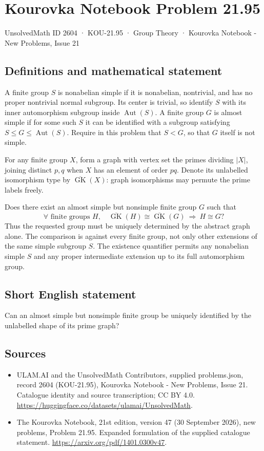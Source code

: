 \documentclass[11pt,a4paper]{article}
\begin{document}
\section*{Kourovka Notebook Problem 21.95}\label{2604}
{\small UnsolvedMath ID 2604 · KOU-21.95 · Group Theory · Kourovka Notebook - New Problems, Issue 21}
\subsection{Definitions and mathematical statement}
A finite group $S$ is nonabelian simple if it is nonabelian, nontrivial, and has no proper nontrivial normal subgroup. Its center is trivial, so identify $S$ with its inner automorphism subgroup inside $\operatorname{Aut}(S)$. A finite group $G$ is almost simple if for some such $S$ it can be identified with a subgroup satisfying $S\le G\le\operatorname{Aut}(S)$. Require in this problem that $S<G$, so that $G$ itself is not simple.

For any finite group $X$, form a graph with vertex set the primes dividing $|X|$, joining distinct $p,q$ when $X$ has an element of order $pq$. Denote its unlabelled isomorphism type by $\overline{\operatorname{GK}}(X)$: graph isomorphisms may permute the prime labels freely.

Does there exist an almost simple but nonsimple finite group $G$ such that
\[
 \forall\text{ finite groups }H,\quad
 \overline{\operatorname{GK}}(H)\cong
 \overline{\operatorname{GK}}(G)\ \Longrightarrow\ H\cong G?
\]
Thus the requested group must be uniquely determined by the abstract graph alone. The comparison is against every finite group, not only other extensions of the same simple subgroup $S$. The existence quantifier permits any nonabelian simple $S$ and any proper intermediate extension up to its full automorphism group.
\subsection{Short English statement}
Can an almost simple but nonsimple finite group be uniquely identified by the unlabelled shape of its prime graph?
\subsection{Sources}
\begin{itemize}
\item[S1] ULAM.AI and the UnsolvedMath Contributors, supplied problems.json, record 2604 (KOU-21.95), Kourovka Notebook - New Problems, Issue 21. Catalogue identity and source transcription; CC BY 4.0.
\url{https://huggingface.co/datasets/ulamai/UnsolvedMath}.
\item[S2] The Kourovka Notebook, 21st edition, version 47 (30 September 2026), new problems, Problem 21.95. Expanded formulation of the supplied catalogue statement.
\url{https://arxiv.org/pdf/1401.0300v47}.
\end{itemize}
\end{document}
